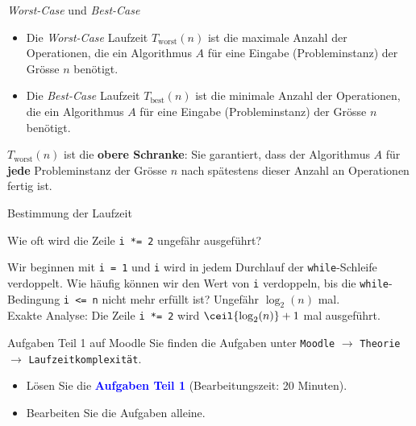 \begin{frame}{\emph{Worst-Case} und \emph{Best-Case}}
	\begin{itemize}[<+->]
		\item Die \emph{Worst-Case} Laufzeit $T_{\text{worst}}(n)$ ist die maximale Anzahl der Operationen, die ein Algorithmus $A$ für eine Eingabe (Probleminstanz) der Grösse $n$ benötigt.
		\item Die \emph{Best-Case} Laufzeit $T_{\text{best}}(n)$ ist die minimale Anzahl der Operationen, die ein Algorithmus $A$ für eine Eingabe (Probleminstanz) der Grösse $n$ benötigt.
	\end{itemize}
\end{frame}

\begin{frame}
\begin{myremark}
	$T_{\text{worst}}(n)$ ist die \textbf{obere Schranke}: Sie garantiert, dass der Algorithmus $A$ für \textbf{jede} Probleminstanz der Grösse $n$ nach spätestens dieser Anzahl an Operationen fertig ist.
\end{myremark}
\end{frame}

\begin{frame}{Bestimmung der Laufzeit \faStar\faStar\faStar[regular]\faStar[regular]\faStar[regular]}
	\begin{myexercise}
	

	Wie oft wird die Zeile \lstinline{i *= 2} ungefähr ausgeführt?
	\end{myexercise}
\end{frame}

\begin{frame}
	\begin{myanswer}
	Wir beginnen mit \lstinline{i = 1} und \lstinline{i} wird in jedem Durchlauf der \lstinline{while}-Schleife verdoppelt. Wie häufig können wir den Wert von \lstinline{i} verdoppeln, bis die \lstinline{while}-Bedingung \lstinline{i <= n} nicht mehr erfüllt ist? Ungefähr $\log_2(n)$ mal.
	\vspace{1cm}\\
	{\small
	Exakte Analyse: Die Zeile \lstinline{i *= 2} wird $\ceil{\log_2(n)} + 1$ mal ausgeführt.
	}
	\end{myanswer}
\end{frame}

\begin{frame}{Aufgaben Teil 1 auf Moodle}
	Sie finden die Aufgaben unter \texttt{Moodle} $\rightarrow$ \texttt{Theorie} $\rightarrow$ \texttt{Laufzeitkomplexität}.
	\pause
	\begin{itemize}[<+->]
		\item Lösen Sie die \textcolor{Blue}{\textbf{Aufgaben Teil 1}} (Bearbeitungszeit: 20 Minuten).
		\item Bearbeiten Sie die Aufgaben alleine.
	\end{itemize}
\end{frame}

